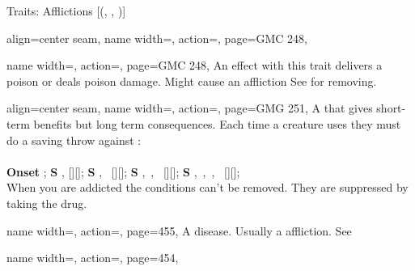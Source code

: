 \begin{PageFrontLandscape}
\begin{TablesHalf}{\frontTableHeight}
\begin{Table}{Traits: Afflictions }[{(, , )}]
\begin{entry}{}{%
                align=center seam,
                name width=\conditionLength,%
                action=\Injury,
                page=GMC 248,
            }
            \end{entry}
            \begin{entry}{}{%
                name width=\conditionLength,%
                action=\Poison,
                page=GMC 248,
            }
                An effect with this trait delivers a poison or deals poison damage.
                Might cause an affliction \hfill
                See  for removing.
            \end{entry}
            \begin{entry}{}{%
                align=center seam,
                name width=\conditionLength,%
                action=\Drug,
                page=GMG 251,
            }
                A \Poison that gives short-term benefits but long term consequences.
                Each time a creature uses they must do a saving throw against :\\
                \newcommand{\Scaleing}{\scalefont{0.9}}
                \Fortitude[][before=Drug] 
                \hfill{}
                \\{\Scaleing
                \textbf{Onset} ;
                \hfill\textbf{S} \Fatigued, [][\Scaleing];
                \hfill\textbf{S} \Fatigued, \Sickened\, [][\Scaleing];
                \hfill\textbf{S} \Fatigued, \Drained\,, \Sickened\, [][\Scaleing];
                \hfill\textbf{S} \Fatigued, \Drained\,, \Sickened\,,
                    \Stupefied\, [][\Scaleing];}
                \\
                When you are addicted the conditions can't be removed.
                They are suppressed by taking the drug. \hfill
            \end{entry}
            \breakLine
            \begin{entry}{}{%
                name width=\conditionLength,%
                action=\Disease,
                page=455,
            }
                A disease. Usually a affliction. \hfill See 
            \end{entry}
            \breakLine
            \begin{entry}{}{%
                name width=\conditionLength,%
                action=\Curse,
                page=454,
            }

\end{entry}
\end{Table}
\end{TablesHalf}
\end{PageFrontLandscape}
